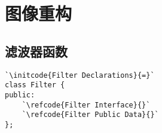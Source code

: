 \section{图像重构}\label{sec:图像重构}

\subsection{滤波器函数}\label{sub:滤波器函数}
\label{code:overview_Filter}
\begin{lstlisting}
`\initcode{Filter Declarations}{=}`
class Filter {
public:
    `\refcode{Filter Interface}{}`
    `\refcode{Filter Public Data}{}`
};
\end{lstlisting}